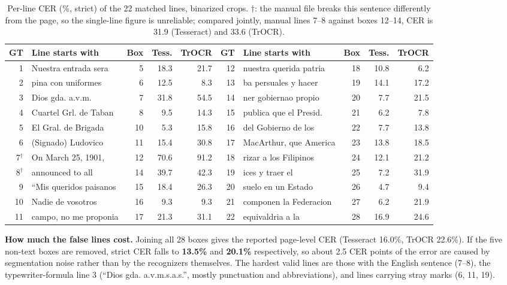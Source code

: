 \documentclass[10pt,twocolumn]{article}
\begin{document}
\begin{table}[t]
\centering\footnotesize
\caption{Per-line CER (\%, strict) of the 22 matched lines, binarized crops. $\dagger$: the manual file breaks this sentence differently from the page, so the single-line figure is unreliable; compared jointly, manual lines 7--8 against boxes 12--14, CER is 31.9 (Tesseract) and 33.6 (TrOCR).}\label{tab:perline}
\setlength{\tabcolsep}{4pt}
\begin{tabular}{@{}rlrrr@{\hspace{14pt}}rlrrr@{}}
\toprule
\textbf{GT} & \textbf{Line starts with} & \textbf{Box} & \textbf{Tess.} & \textbf{TrOCR} & \textbf{GT} & \textbf{Line starts with} & \textbf{Box} & \textbf{Tess.} & \textbf{TrOCR}\\
\midrule
1 & Nuestra entrada sera & 5 & 18.3 & 21.7 & 12 & nuestra querida patria & 18 & 10.8 & 6.2\\
2 & pina con uniformes & 6 & 12.5 & 8.3 & 13 & ba persuales y hacer & 19 & 14.1 & 17.2\\
3 & Dios gda. a.v.m. & 7 & 31.8 & 54.5 & 14 & ner gobiernao propio & 20 & 7.7 & 21.5\\
4 & Cuartel Grl. de Taban & 8 & 9.5 & 14.3 & 15 & publica que el Presid. & 21 & 6.2 & 7.8\\
5 & El Gral. de Brigada & 10 & 5.3 & 15.8 & 16 & del Gobierno de los & 22 & 7.7 & 13.8\\
6 & (Signado) Ludovico & 11 & 15.4 & 30.8 & 17 & MacArthur, que America & 23 & 13.8 & 18.5\\
7$^\dagger$ & On March 25, 1901, & 12 & 70.6 & 91.2 & 18 & rizar a los Filipinos & 24 & 12.1 & 21.2\\
8$^\dagger$ & announced to all & 14 & 39.7 & 42.3 & 19 & ices y traer el & 25 & 7.2 & 31.9\\
9 & ``Mis queridos paisanos & 15 & 18.4 & 26.3 & 20 & suelo en un Estado & 26 & 4.7 & 9.4\\
10 & Nadie de vosotros & 16 & 9.3 & 9.3 & 21 & componen la Federacion & 27 & 6.2 & 21.9\\
11 & campo, no me proponia & 17 & 21.3 & 31.1 & 22 & equivaldria a la & 28 & 16.9 & 24.6\\
\bottomrule
\end{tabular}
\end{table}

\textbf{How much the false lines cost.} Joining all 28 boxes gives the reported page-level CER (Tesseract 16.0\%, TrOCR 22.6\%). If the five non-text boxes are removed, strict CER falls to \textbf{13.5\%} and \textbf{20.1\%} respectively, so about 2.5 CER points of the error are caused by segmentation noise rather than by the recognizers themselves. The hardest valid lines are those with the English sentence (7--8), the typewriter-formula line 3 (``Dios gda. a.v.m.s.a.s.'', mostly punctuation and abbreviations), and lines carrying stray marks (6, 11, 19).
\end{document}

